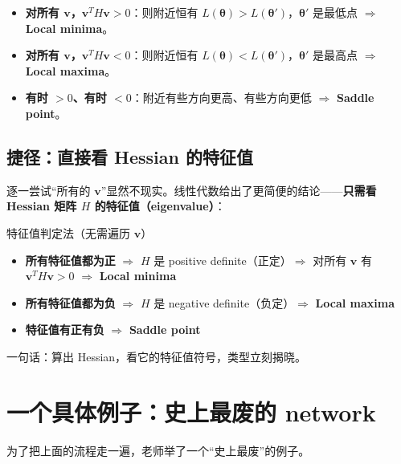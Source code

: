 \documentclass[a4paper]{article}
\begin{document}
\begin{itemize}
    \item \textbf{对所有 $\boldsymbol{v}$，$\boldsymbol{v}^{T}H\boldsymbol{v} > 0$}：则附近恒有 $L(\boldsymbol{\theta}) > L(\boldsymbol{\theta}')$，$\boldsymbol{\theta}'$ 是最低点 $\Rightarrow$ \textbf{Local minima}。
    \item \textbf{对所有 $\boldsymbol{v}$，$\boldsymbol{v}^{T}H\boldsymbol{v} < 0$}：则附近恒有 $L(\boldsymbol{\theta}) < L(\boldsymbol{\theta}')$，$\boldsymbol{\theta}'$ 是最高点 $\Rightarrow$ \textbf{Local maxima}。
    \item \textbf{有时 $>0$、有时 $<0$}：附近有些方向更高、有些方向更低 $\Rightarrow$ \textbf{Saddle point}。
\end{itemize}

\subsection{捷径：直接看 Hessian 的特征值}

逐一尝试``所有的 $\boldsymbol{v}$''显然不现实。线性代数给出了更简便的结论——\textbf{只需看 Hessian 矩阵 $H$ 的特征值（eigenvalue）}：

\begin{importantbox}{特征值判定法（无需遍历 $\boldsymbol{v}$）}
    \begin{itemize}
        \item \textbf{所有特征值都为正} $\Rightarrow$ $H$ 是 positive definite（正定）$\Rightarrow$ 对所有 $\boldsymbol{v}$ 有 $\boldsymbol{v}^{T}H\boldsymbol{v}>0$ $\Rightarrow$ \textbf{Local minima}
        \item \textbf{所有特征值都为负} $\Rightarrow$ $H$ 是 negative definite（负定）$\Rightarrow$ \textbf{Local maxima}
        \item \textbf{特征值有正有负} $\Rightarrow$ \textbf{Saddle point}
    \end{itemize}
    一句话：算出 Hessian，看它的特征值符号，类型立刻揭晓。
\end{importantbox}

\section{一个具体例子：史上最废的 network}

为了把上面的流程走一遍，老师举了一个``史上最废''的例子。
\end{document}

